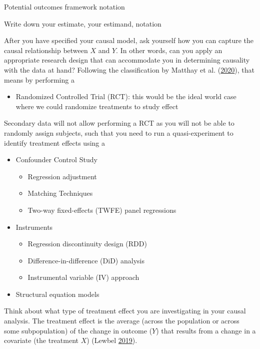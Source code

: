 \documentclass[
]{book}
\providecommand{\tightlist}{%
  \setlength{\itemsep}{0pt}\setlength{\parskip}{0pt}}
\begin{document}
Potential outcomes framework notation

Write down your estimate, your estimand, notation

After you have specified your causal model, ask yourself how you can
capture the causal relationship between \(X\) and \(Y\). In other words,
can you apply an appropriate research design that can accommodate you in
determining causality with the data at hand? Following the
classification by Matthay et al.
(\protect\hyperlink{ref-matthay_alternative_2020}{2020}), that means by
performing a

\begin{itemize}
\tightlist
\item
  Randomized Controlled Trial (RCT): this would be the ideal world case
  where we could randomize treatments to study effect
\end{itemize}

Secondary data will not allow performing a RCT as you will not be able
to randomly assign subjects, such that you need to run a
quasi-experiment to identify treatment effects using a

\begin{itemize}
\item
  Confounder Control Study

  \begin{itemize}
  \tightlist
  \item
    Regression adjustment
  \item
    Matching Techniques
  \item
    Two-way fixed-effects (TWFE) panel regressions
  \end{itemize}
\item
  Instruments

  \begin{itemize}
  \tightlist
  \item
    Regression discontinuity design (RDD)
  \item
    Difference-in-difference (DiD) analysis
  \item
    Instrumental variable (IV) approach
  \end{itemize}
\item
  Structural equation models
\end{itemize}

Think about what type of treatment effect you are investigating in your
causal analysis. The treatment effect is the average (across the
population or across some subpopulation) of the change in outcome
(\(Y\)) that results from a change in a covariate (the treatment \(X\))
(Lewbel \protect\hyperlink{ref-lewbel_identification_2019}{2019}).
\end{document}
